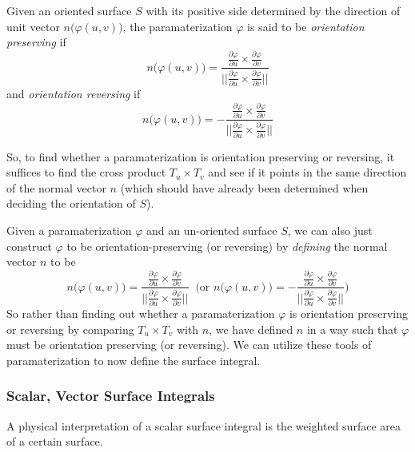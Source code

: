   \begin{definition}
  Given an oriented surface $S$ with its positive side determined by the direction of unit vector $n\big( \varphi(u,v)\big)$, the paramaterization $\varphi$ is said to be \textit{orientation preserving} if 
  \[n \big( \varphi(u, v)\big) = \frac{\frac{\partial \varphi}{\partial u} \times \frac{\partial \varphi}{\partial v}}{\big|\big|\frac{\partial \varphi}{\partial u} \times \frac{\partial \varphi}{\partial v}\big|\big|}\]
  and \textit{orientation reversing} if
  \[n \big( \varphi(u, v)\big) = - \frac{\frac{\partial \varphi}{\partial u} \times \frac{\partial \varphi}{\partial v}}{\big|\big|\frac{\partial \varphi}{\partial u} \times \frac{\partial \varphi}{\partial v}\big|\big|}\]
  \end{definition}

  So, to find whether a paramaterization is orientation preserving or reversing, it suffices to find the cross product $T_u \times T_v$ and see if it points in the same direction of the normal vector $n$ (which should have already been determined when deciding the orientation of $S$). 

  Given a paramaterization $\varphi$ and an un-oriented surface $S$, we can also just construct $\varphi$ to be orientation-preserving (or reversing) by \textit{defining} the normal vector $n$ to be 
  \[n\big( \varphi(u, v)\big) = \frac{\frac{\partial \varphi}{\partial u} \times \frac{\partial \varphi}{\partial v}}{\big|\big|\frac{\partial \varphi}{\partial u} \times \frac{\partial \varphi}{\partial v}\big|\big|} \;\; \bigg( \text{or } n\big( \varphi(u, v)\big) = - \frac{\frac{\partial \varphi}{\partial u} \times \frac{\partial \varphi}{\partial v}}{\big|\big|\frac{\partial \varphi}{\partial u} \times \frac{\partial \varphi}{\partial v}\big|\big|} \bigg)\]
  So rather than finding out whether a paramaterization $\varphi$ is orientation preserving or reversing by comparing $T_u \times T_v$ with $n$, we have defined $n$ in a way such that $\varphi$ must be orientation preserving (or reversing). We can utilize these tools of paramaterization to now define the surface integral. 

  \subsubsection{Scalar, Vector Surface Integrals}

  A physical interpretation of a scalar surface integral is the weighted surface area of a certain surface. 

